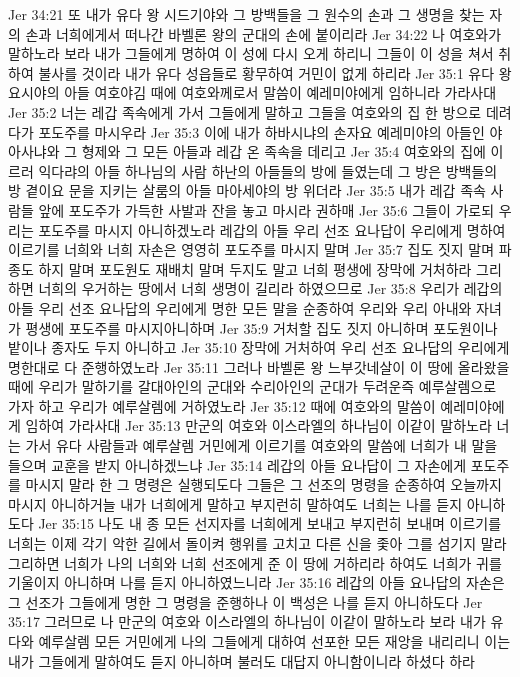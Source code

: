 Jer 34:21  또 내가 유다 왕 시드기야와 그 방백들을 그 원수의 손과 그 생명을 찾는 자의 손과 너희에게서 떠나간 바벨론 왕의 군대의 손에 붙이리라
Jer 34:22  나 여호와가 말하노라 보라 내가 그들에게 명하여 이 성에 다시 오게 하리니 그들이 이 성을 쳐서 취하여 불사를 것이라 내가 유다 성읍들로 황무하여 거민이 없게 하리라
Jer 35:1  유다 왕 요시야의 아들 여호야김 때에 여호와께로서 말씀이 예레미야에게 임하니라 가라사대
Jer 35:2  너는 레갑 족속에게 가서 그들에게 말하고 그들을 여호와의 집 한 방으로 데려다가 포도주를 마시우라
Jer 35:3  이에 내가 하바시냐의 손자요 예레미야의 아들인 야아사냐와 그 형제와 그 모든 아들과 레갑 온 족속을 데리고
Jer 35:4  여호와의 집에 이르러 익다랴의 아들 하나님의 사람 하난의 아들들의 방에 들였는데 그 방은 방백들의 방 곁이요 문을 지키는 살룸의 아들 마아세야의 방 위더라
Jer 35:5  내가 레갑 족속 사람들 앞에 포도주가 가득한 사발과 잔을 놓고 마시라 권하매
Jer 35:6  그들이 가로되 우리는 포도주를 마시지 아니하겠노라 레갑의 아들 우리 선조 요나답이 우리에게 명하여 이르기를 너희와 너희 자손은 영영히 포도주를 마시지 말며
Jer 35:7  집도 짓지 말며 파종도 하지 말며 포도원도 재배치 말며 두지도 말고 너희 평생에 장막에 거처하라 그리하면 너희의 우거하는 땅에서 너희 생명이 길리라 하였으므로
Jer 35:8  우리가 레갑의 아들 우리 선조 요나답의 우리에게 명한 모든 말을 순종하여 우리와 우리 아내와 자녀가 평생에 포도주를 마시지아니하며
Jer 35:9  거처할 집도 짓지 아니하며 포도원이나 밭이나 종자도 두지 아니하고
Jer 35:10  장막에 거처하여 우리 선조 요나답의 우리에게 명한대로 다 준행하였노라
Jer 35:11  그러나 바벨론 왕 느부갓네살이 이 땅에 올라왔을 때에 우리가 말하기를 갈대아인의 군대와 수리아인의 군대가 두려운즉 예루살렘으로 가자 하고 우리가 예루살렘에 거하였노라
Jer 35:12  때에 여호와의 말씀이 예레미야에게 임하여 가라사대
Jer 35:13  만군의 여호와 이스라엘의 하나님이 이같이 말하노라 너는 가서 유다 사람들과 예루살렘 거민에게 이르기를 여호와의 말씀에 너희가 내 말을 들으며 교훈을 받지 아니하겠느냐
Jer 35:14  레갑의 아들 요나답이 그 자손에게 포도주를 마시지 말라 한 그 명령은 실행되도다 그들은 그 선조의 명령을 순종하여 오늘까지 마시지 아니하거늘 내가 너희에게 말하고 부지런히 말하여도 너희는 나를 듣지 아니하도다
Jer 35:15  나도 내 종 모든 선지자를 너희에게 보내고 부지런히 보내며 이르기를 너희는 이제 각기 악한 길에서 돌이켜 행위를 고치고 다른 신을 좇아 그를 섬기지 말라 그리하면 너희가 나의 너희와 너희 선조에게 준 이 땅에 거하리라 하여도 너희가 귀를 기울이지 아니하며 나를 듣지 아니하였느니라
Jer 35:16  레갑의 아들 요나답의 자손은 그 선조가 그들에게 명한 그 명령을 준행하나 이 백성은 나를 듣지 아니하도다
Jer 35:17  그러므로 나 만군의 여호와 이스라엘의 하나님이 이같이 말하노라 보라 내가 유다와 예루살렘 모든 거민에게 나의 그들에게 대하여 선포한 모든 재앙을 내리리니 이는 내가 그들에게 말하여도 듣지 아니하며 불러도 대답지 아니함이니라 하셨다 하라
